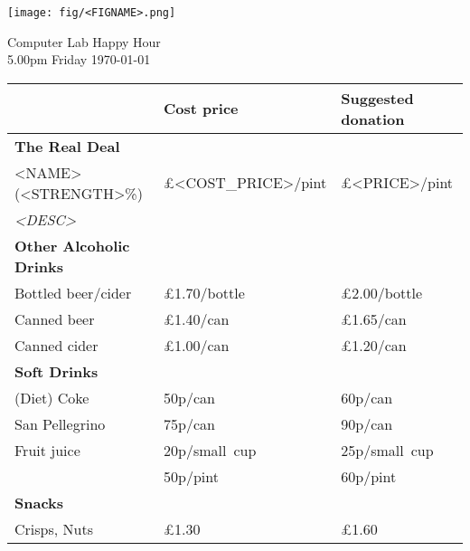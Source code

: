 \documentclass[a4paper,12pt]{article}
\begin{document}
\begin{center}
	\texttt{[image: fig/<FIGNAME>.png]} \par \bigskip \bigskip \bigskip
    {\Large Computer Lab Happy Hour} \\ \smallskip
    {5.00pm Friday \today}
\end{center}

\bigskip

\large
\begin{center}

\def\arraystretch{1.1}

\begin{tabular}{p{7.5cm}|p{3cm}|p{3cm}} & \textbf{Cost price} & \textbf{Suggested donation} \\
\hline
\textbf{The Real Deal} & & \\
<NAME> (<STRENGTH>\%) & \pounds <COST_PRICE>/pint & \pounds <PRICE>/pint \\
\small \it <DESC> \medskip & & \\

\hline
{\bf Other Alcoholic Drinks} & & \\
Bottled beer/cider & \pounds 1.70/bottle & \pounds 2.00/bottle \\
Canned beer & \pounds 1.40/can & \pounds 1.65/can \\
Canned cider & \pounds 1.00/can & \pounds 1.20/can \medskip \\

\hline
{\bf Soft Drinks} &&\\
(Diet) Coke & 50p/can  & 60p/can \\
San Pellegrino & 75p/can & 90p/can \medskip \\
Fruit juice & 20p/small~cup & 25p/small~cup \\
& 50p/pint & 60p/pint \medskip \\

\hline
{\bf Snacks} & & \\
Crisps, Nuts &\pounds 1.30 &\pounds 1.60 \\

\end{tabular}
\end{center}
\end{document}
